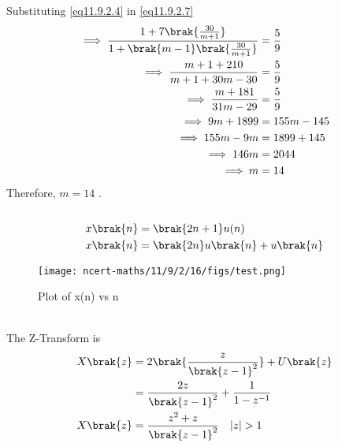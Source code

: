 \documentclass[journal,12pt,onecolumn]{IEEEtran}
\theoremstyle{remark}
\begin{document}
Substituting  \eqref{eq11.9.2.4} in \eqref{eq11.9.2.7}\\
\begin{align}
\implies \frac{1+7\brak{{\frac{30}{m+1}}}}{1+\brak{{m-1}}\brak{\frac{30}{m+1}}} &= \frac{5}{9} \\
\implies \frac{m+1+210}{m+1+30m-30} &= \frac{5}{9}\\
\implies \frac{m+181}{31m-29} &= \frac{5}{9}\\
\implies 9m+1899 &=155m-145\\
\implies 155m-9m &=1899+145\\
\implies 146m &=2044\\
\implies m &=14
\end{align}
Therefore, $m = 14$ .\\
  \\
\begin{align}
    x\brak{n}&=\brak{2n+1}u(n)\\
    x\brak{n}&=\brak{2n}u\brak{n}+u\brak{n}
\end{align}
\begin{figure}
    \centering
    \texttt{[image: ncert-maths/11/9/2/16/figs/test.png]}
    \caption{Plot of x(n) vs n}
    \label{fig:11.9.2.1}
\end{figure}\\
The Z-Transform is\\
\begin{align}
    X\brak{z}&=2\brak{\dfrac{z}{\brak{z-1}^{2}}}+U\brak{z}\\
    &=\dfrac{2z}{\brak{z-1}^{2}}+\dfrac{1}{1-z^{-1}}\\
    X\brak{z}&=\dfrac{z^2+z}{\brak{z-1}^{2}} \quad{|z|>1}
\end{align}
\end{document}
